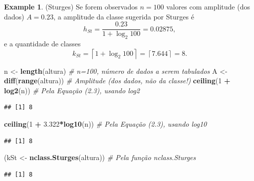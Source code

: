 \documentclass[
]{book}
\newenvironment{Shaded}{\begin{snugshade}}{\end{snugshade}}
\newcommand{\CommentTok}[1]{\textcolor[rgb]{0.56,0.35,0.01}{\textit{#1}}}
\newcommand{\DecValTok}[1]{\textcolor[rgb]{0.00,0.00,0.81}{#1}}
\newcommand{\FloatTok}[1]{\textcolor[rgb]{0.00,0.00,0.81}{#1}}
\newcommand{\KeywordTok}[1]{\textcolor[rgb]{0.13,0.29,0.53}{\textbf{#1}}}
\newcommand{\NormalTok}[1]{#1}
\newcommand{\OperatorTok}[1]{\textcolor[rgb]{0.81,0.36,0.00}{\textbf{#1}}}
\newcommand{\StringTok}[1]{\textcolor[rgb]{0.31,0.60,0.02}{#1}}
\theoremstyle{definition}
\theoremstyle{definition}
\newtheorem{example}{Example}[chapter]
\theoremstyle{definition}
\theoremstyle{remark}
\begin{document}
\begin{example}
\protect\hypertarget{exm:sturges}{}{\label{exm:sturges} }(Sturges) Se forem observados \(n=100\) valores com amplitude (dos dados) \(A=0.23\), a amplitude da classe sugerida por Sturges é \[h_{St} = \frac{0.23}{1 + \log_{2}{100}} = 0.02875,\] e a quantidade de classes \[k_{St} = \left\lceil 1 + \log_{2}{100} \right\rceil = \left\lceil 7.644 \right\rceil = 8.\]
\end{example}

\begin{Shaded}
\begin{Highlighting}[]
\NormalTok{n \textless{}{-}}\StringTok{ }\KeywordTok{length}\NormalTok{(altura)               }\CommentTok{\# n=100, número de dados a serem tabulados}
\NormalTok{A \textless{}{-}}\StringTok{ }\KeywordTok{diff}\NormalTok{(}\KeywordTok{range}\NormalTok{(altura))          }\CommentTok{\# Amplitude (dos dados, não da classe!)}
\KeywordTok{ceiling}\NormalTok{(}\DecValTok{1} \OperatorTok{+}\StringTok{ }\KeywordTok{log2}\NormalTok{(n))              }\CommentTok{\# Pela Equação (2.3), usando log2}
\end{Highlighting}
\end{Shaded}

\begin{verbatim}
## [1] 8
\end{verbatim}

\begin{Shaded}
\begin{Highlighting}[]
\KeywordTok{ceiling}\NormalTok{(}\DecValTok{1} \OperatorTok{+}\StringTok{ }\FloatTok{3.322}\OperatorTok{*}\KeywordTok{log10}\NormalTok{(n))       }\CommentTok{\# Pela Equação (2.3), usando log10}
\end{Highlighting}
\end{Shaded}

\begin{verbatim}
## [1] 8
\end{verbatim}

\begin{Shaded}
\begin{Highlighting}[]
\NormalTok{(kSt \textless{}{-}}\StringTok{ }\KeywordTok{nclass.Sturges}\NormalTok{(altura))   }\CommentTok{\# Pela função \textquotesingle{}nclass.Sturges\textquotesingle{}}
\end{Highlighting}
\end{Shaded}

\begin{verbatim}
## [1] 8
\end{verbatim}
\end{document}
